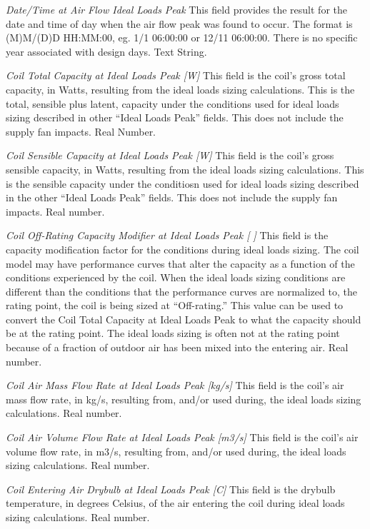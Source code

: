 \emph{Date/Time at Air Flow Ideal Loads Peak}  This field provides the result for the date and time of day when the air flow peak was found to occur.  The format is (M)M/(D)D HH:MM:00, eg. 1/1 06:00:00 or 12/11 06:00:00.  There is no specific year associated with design days. Text String.

\emph{Coil Total Capacity at Ideal Loads Peak [W]}  This field is the coil's gross total capacity, in Watts, resulting from the ideal loads sizing calculations.  This is the total, sensible plus latent, capacity under the conditions used for ideal loads sizing described in other ``Ideal Loads Peak'' fields.  This does not include the supply fan impacts.  Real Number.

\emph{Coil Sensible Capacity at Ideal Loads Peak [W]}  This field is the coil's gross sensible capacity, in Watts, resulting from the ideal loads sizing calculations.  This is the sensible capacity under the conditiosn used for ideal loads sizing described in the other ``Ideal Loads Peak'' fields.  This does not include the supply fan impacts.  Real number.

\emph{Coil Off-Rating Capacity Modifier at Ideal Loads Peak [ ]}  This field is the capacity modification factor for the conditions during ideal loads sizing.  The coil model may have performance curves that alter the capacity as a function of the conditions experienced by the coil. When the ideal loads sizing conditions are different than the conditions that the performance curves are normalized to, the rating point, the coil is being sized at ``Off-rating.''  This value can be used to convert the Coil Total Capacity at Ideal Loads Peak to what the capacity should be at the rating point.  The ideal loads sizing is often not at the rating point because of a fraction of outdoor air has been mixed into the entering air. Real number.

\emph{Coil Air Mass Flow Rate at Ideal Loads Peak [kg/s]}  This field is the coil's air mass flow rate, in kg/s, resulting from, and/or used during, the ideal loads sizing calculations.  Real number.

\emph{Coil Air Volume Flow Rate at Ideal Loads Peak [m3/s]}  This field is the coil's air volume flow rate, in m3/s, resulting from, and/or used during, the ideal loads sizing calculations.  Real number.

\emph{Coil Entering Air Drybulb at Ideal Loads Peak [C]}  This field is the drybulb temperature, in degrees Celsius, of the air entering the coil during ideal loads sizing calculations.  Real number.

